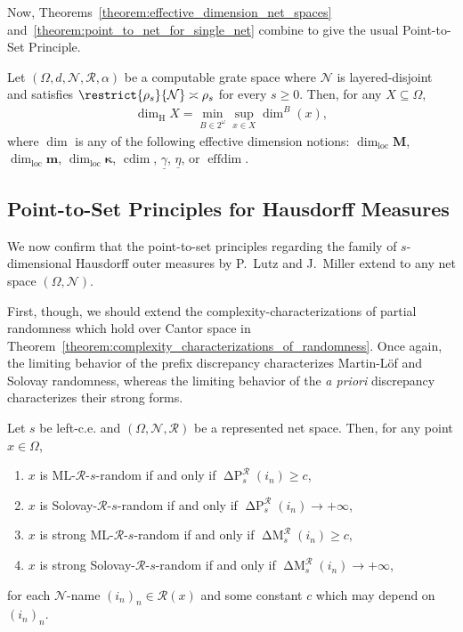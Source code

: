 Now, Theorems~\ref{theorem:effective_dimension_net_spaces} and~\ref{theorem:point_to_net_for_single_net} combine to give the usual Point-to-Set Principle.
\begin{corollary}
    \label{corollary:PTS_for_computable_grate_spaces}
    Let $(\Omega, d, \mathcal{N}, \mathscr{R}, \alpha)$ be a computable grate space where $\mathcal{N}$ is layered-disjoint and satisfies $\restrict{\rho_s}{\mathcal{N}} \asymp \rho_s$ for every $s \geq 0$. Then, for any $X \subseteq \Omega$,
    \begin{align*}
        \dim_{\operatorname{H}} X = \min_{B \in 2^\omega} \sup_{x \in X} \dim^B(x),
    \end{align*}
    where $\dim$ is any of the following effective dimension notions: $\dim_{\operatorname{loc}}\mathbf{M}$, $\dim_{\operatorname{loc}}\mathbf{m}$,
    $\dim_{\operatorname{loc}}\boldsymbol{\kappa}$, $\operatorname{cdim}$, $\underline{\gamma}$, $\underline{\eta}$, or $\operatorname{effdim}$.
\end{corollary}

\subsection{Point-to-Set Principles for Hausdorff Measures}

We now confirm that the point-to-set principles regarding the family of $s$-dimensional Hausdorff outer measures by P.~Lutz and J.~Miller extend to any net space $(\Omega, \mathcal{N})$.

First, though, we should extend the complexity-characterizations of partial randomness which hold over Cantor space in Theorem~\ref{theorem:complexity_characterizations_of_randomness}. Once again, the limiting behavior of the prefix discrepancy characterizes Martin-L{\"o}f and Solovay randomness, whereas the limiting behavior of the \textit{a priori} discrepancy characterizes their strong forms. 

\begin{theorem}
    \label{theorem:entropy_characterizations_of_randomness}
    Let $s$ be left-c.e. and $(\Omega, \mathcal{N}, \mathscr{R})$ be a represented net space. Then, for any point $x \in \Omega$,
    \begin{enumerate}[label = (\roman*)]
        \item $x$ is ML-$\mathscr{R}$-$s$-random if and only if $\operatorname{\Delta P}^{\mathscr{R}}_s(i_n) \geq c$,
        \item $x$ is Solovay-$\mathscr{R}$-$s$-random if and only if $\operatorname{\Delta P}^{\mathscr{R}}_s(i_n) \to + \infty$, 
        \item $x$ is strong ML-$\mathscr{R}$-$s$-random if and only if $\operatorname{\Delta M}^{\mathscr{R}}_s(i_n) \geq c$, 
        \item $x$ is strong Solovay-$\mathscr{R}$-$s$-random if and only if $\operatorname{\Delta M}^{\mathscr{R}}_s(i_n) \to + \infty$,
    \end{enumerate}
    for each $\mathcal{N}$-name $(i_n)_n \in \mathcal{R}(x)$ and some constant $c$ which may depend on $(i_n)_n$.
\end{theorem}

